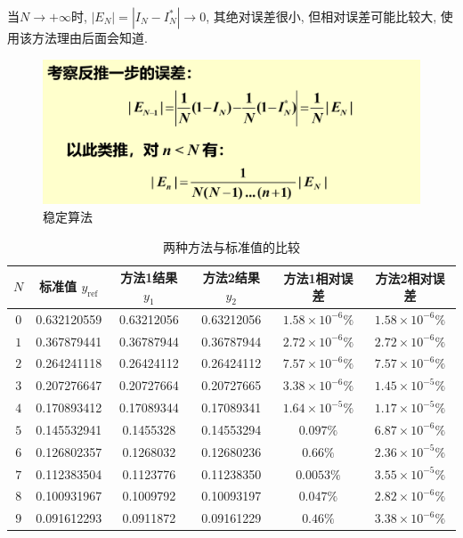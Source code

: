 \documentclass[lang=cn,newtx,12pt,scheme=chinese]{elegantbook}
\begin{document}
 当$N\to+\infty$时, $|E_N|=|I_N-I_N^*|\to0$, 其绝对误差很小, 但相对误差可能比较大, 使用该方法理由后面会知道.
 \begin{figure}[H]
 	\centering
 	\includegraphics[width=0.7\linewidth]{image/误差3}
 	\caption{稳定算法}
 	\label{fig:3}
 \end{figure}
\begin{table}[h]
	\centering
	\caption{两种方法与标准值的比较}
	\begin{tabular}{cccccc}
		\toprule
		\(N\) & 标准值 \(y_{\text{ref}}\) & 方法1结果 \(y_1\) & 方法2结果 \(y_2\) & 方法1相对误差 & 方法2相对误差 \\ 
		\midrule
		\(0\)    & 0.632120559     & 0.63212056     & 0.63212056     & \(1.58 \times 10^{-6}\%\) & \(1.58 \times 10^{-6}\%\) \\
		\(1\)    & 0.367879441     & 0.36787944     & 0.36787944     & \(2.72 \times 10^{-6}\%\) & \(2.72 \times 10^{-6}\%\) \\
		\(2\)    & 0.264241118     & 0.26424112     & 0.26424112     & \(7.57 \times 10^{-6}\%\) & \(7.57 \times 10^{-6}\%\) \\
		\(3\)    & 0.207276647     & 0.20727664     & 0.20727665     & \(3.38 \times 10^{-6}\%\) & \(1.45 \times 10^{-5}\%\) \\
		\(4\)    & 0.170893412     & 0.17089344     & 0.17089341     & \(1.64 \times 10^{-5}\%\) & \(1.17 \times 10^{-5}\%\) \\
		\(5\)    & 0.145532941     & 0.1455328     & 0.14553294     & \(0.097\% \) & \(6.87 \times 10^{-6}\%\) \\
		\(6\)    & 0.126802357     & 0.1268032     & 0.12680236     & \(0.66\% \) & \(2.36 \times 10^{-5}\%\) \\
		\(7\)    & 0.112383504     & 0.1123776     & 0.11238350     & \(0.0053\% \) & \(3.55 \times 10^{-5}\%\) \\
		\(8\)    & 0.100931967     & 0.1009792     & 0.10093197     & \(0.047\% \) & \(2.82 \times 10^{-6}\%\) \\
		\(9\)    & 0.091612293     & 0.0911872     & 0.09161229     & \(0.46\% \) & \(3.38 \times 10^{-6}\%\) \\

\end{tabular}
\end{table}
\end{document}

